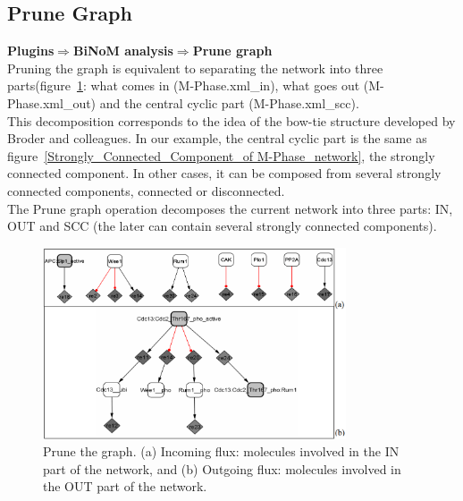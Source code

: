 \subsection{Prune Graph}
\textbf{Plugins$\Rightarrow$BiNoM analysis$\Rightarrow$Prune graph}\\
Pruning the graph is equivalent to separating the network into three parts(figure~\ref{Prune_the_graph}: what comes in (M-Phase.xml\_in), what goes out (M-Phase.xml\_out) and the central cyclic part (M-Phase.xml\_scc).
\\This decomposition corresponds to the idea of the bow-tie structure developed by Broder and colleagues\cite{broder2000graph}. In our example, the central cyclic part is the same as figure~\ref{Strongly_Connected_Component_of M-Phase_network}, the strongly connected component. In other cases, it can be composed from several strongly connected components, connected or disconnected.\\
The Prune graph operation decomposes the current network into three parts: IN, OUT and SCC (the later can contain several strongly connected components).
\begin{figure}
\centering
\includegraphics[width=0.8\textwidth]{graphics/Prune_the_graph}
\caption{Prune the graph. (a) Incoming flux: molecules involved in the IN part of the network, and (b) Outgoing flux: molecules involved in the OUT part of the network.}
\label{Prune_the_graph}
\end{figure}

